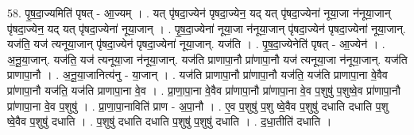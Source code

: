 \documentclass[17pt]{extarticle}
\begin{document}
58. पृ॒ष॒दा॒ज्यमिति॑ पृषत् - आ॒ज्यम् । . यत् पृ॑षदा॒ज्येन॑ पृषदा॒ज्येन॒ यद् यत् पृ॑षदा॒ज्येना॑ नूया॒जा न॑नूया॒जान् पृ॑षदा॒ज्येन॒ यद् यत् पृ॑षदा॒ज्येना॑ नूया॒जान् । . पृ॒ष॒दा॒ज्येना॑ नूया॒जा न॑नूया॒जान् पृ॑षदा॒ज्येन॑ पृषदा॒ज्येना॑ नूया॒जान्. यज॑ति॒ यज॑ त्यनूया॒जान् पृ॑षदा॒ज्येन॑ पृषदा॒ज्येना॑ नूया॒जान्. यज॑ति । . पृ॒ष॒दा॒ज्येनेति॑ पृषत् - आ॒ज्येन॑ । . अ॒नू॒या॒जान्. यज॑ति॒ यज॑ त्यनूया॒जा न॑नूया॒जान्. यज॑ति प्राणापा॒नौ प्रा॑णापा॒नौ यज॑ त्यनूया॒जा न॑नूया॒जान्. यज॑ति प्राणापा॒नौ । . अ॒नू॒या॒जानित्य॑नु - या॒जान् । . यज॑ति प्राणापा॒नौ प्रा॑णापा॒नौ यज॑ति॒ यज॑ति प्राणापा॒ना वे॒वैव प्रा॑णापा॒नौ यज॑ति॒ यज॑ति प्राणापा॒ना वे॒व । . प्रा॒णा॒पा॒ना वे॒वैव प्रा॑णापा॒नौ प्रा॑णापा॒ना वे॒व प॒शुषु॑ प॒शुष्वे॒व प्रा॑णापा॒नौ प्रा॑णापा॒ना वे॒व प॒शुषु॑ । . प्रा॒णा॒पा॒नाविति॑ प्राण - अ॒पा॒नौ । . ए॒व प॒शुषु॑ प॒शु ष्वे॒वैव प॒शुषु॑ दधाति दधाति प॒शु ष्वे॒वैव प॒शुषु॑ दधाति । . प॒शुषु॑ दधाति दधाति प॒शुषु॑ प॒शुषु॑ दधाति । . द॒धा॒तीति॑ दधाति । \newline
\pagebreak
\end{document}
